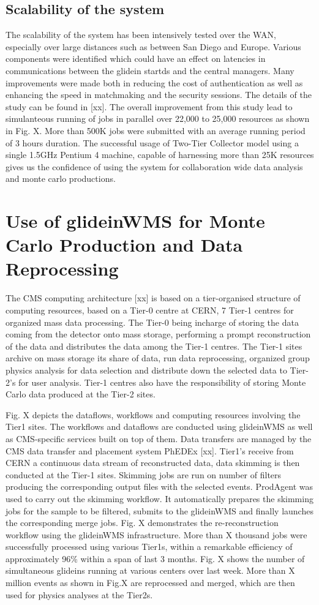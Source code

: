 \documentclass[a4paper]{jpconf}
\begin{document}
\subsection {Scalability of the system}
The scalability of the system has been intensively tested over the WAN, especially over large distances such 
as between San Diego and Europe. Various components were identified which could have an effect on
latencies in communications between the glidein startds and the central managers. Many improvements were
made both in reducing the cost of authentication as well as enhancing the speed in matchmaking and 
the security sessions. The details of the study can be found in [xx]. The overall improvement from this
study lead to simulanteous running of jobs in parallel over 22,000 to 25,000 resources as shown in Fig. X.
More than 500K jobs were submitted with an average running period of 3 hours duration. The successful usage
of Two-Tier Collector model using a single 1.5GHz Pentium 4 machine, capable of harnessing more than 25K 
resources gives us the confidence of using the system for collaboration wide data analysis and monte carlo 
productions.
\section{Use of glideinWMS for Monte Carlo Production and Data Reprocessing }
The CMS computing architecture [xx] is based on a tier-organised structure of computing
resources, based on a Tier-0 centre at CERN, 7 Tier-1 centres for organized mass data processing. 
The Tier-0 being incharge of storing the data coming from the detector onto mass storage, performing a prompt 
reconstruction of the data and distributes the data among the Tier-1 centres. The Tier-1 sites archive on
mass storage its share of data, run data reprocessing, organized group physics analysis for data
selection and distribute down the selected data to Tier-2’s for user analysis. Tier-1 centres also
have the responsibility of storing Monte Carlo data produced at the Tier-2 sites. 

Fig. X depicts the dataflows, workflows and computing resources involving the Tier1 sites.
The workflows and dataflows are conducted using glideinWMS  as well as CMS-specific services 
built on top of them. Data transfers are managed by the CMS data transfer and placement 
system PhEDEx [xx]. Tier1's receive from CERN a continuous data stream of reconstructed data, data skimming 
is then conducted at the Tier-1 sites. Skimming jobs are run on number of filters producing the 
corresponding output files with the selected events. ProdAgent was used to carry out the skimming workflow. 
It automatically prepares the skimming jobs for the sample to be filtered, submits to the glideinWMS and finally
launches the corresponding merge jobs. Fig. X demonstrates the re-reconstruction workflow 
using the glideinWMS infrastructure. More than X thousand jobs were successfully processed using various 
Tier1s, within a remarkable efficiency of approximately 96\% within a span of last 3 months. 
Fig. X shows the number of simultaneous glideins running at various centers over last week. More than X million 
events as shown in Fig.X are reprocessed and merged, which are then used for physics analyses at
the Tier2s. 
\end{document}
